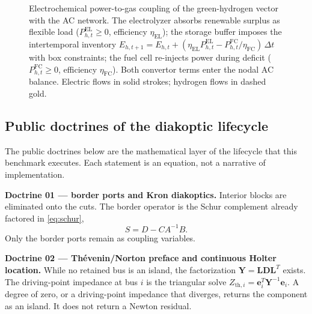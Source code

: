 \begin{figure}[!t]
\centering
\resizebox{0.85\textwidth}{!}{} %
\caption{Electrochemical power-to-gas coupling of the green-hydrogen vector with the AC network. The electrolyzer absorbs renewable surplus as flexible load ($P^{\mathrm{EL}}_{h,t} \ge 0$, efficiency $\eta_{\mathrm{EL}}$); the storage buffer imposes the intertemporal inventory $E_{h,t+1} = E_{h,t} + (\eta_{\mathrm{EL}} P^{\mathrm{EL}}_{h,t} - P^{\mathrm{FC}}_{h,t}/\eta_{\mathrm{FC}})\,\Delta t$ with box constraints; the fuel cell re-injects power during deficit ($P^{\mathrm{FC}}_{h,t} \ge 0$, efficiency $\eta_{\mathrm{FC}}$). Both convertor terms enter the nodal AC balance. Electric flows in solid strokes; hydrogen flows in dashed gold.}
\label{fig:p2g_h2}
\end{figure}


\subsection{Public doctrines of the diakoptic lifecycle}
\label{sub:doctrines}

The public doctrines below are the mathematical layer of the lifecycle that this benchmark executes. Each statement is an equation, not a narrative of implementation.

\textbf{Doctrine 01 --- border ports and Kron diakoptics.} Interior blocks are eliminated onto the cuts. The border operator is the Schur complement already factored in \eqref{eq:schur},
\begin{equation*}
S = D - C A^{-1} B.
\end{equation*}
Only the border ports remain as coupling variables.

\textbf{Doctrine 02 --- Th\'evenin/Norton preface and continuous Holter location.} While no retained bus is an island, the factorization $\mathbf{Y}=\mathbf{L}\mathbf{D}\mathbf{L}^{T}$ exists. The driving-point impedance at bus $i$ is the triangular solve $Z_{\mathrm{th},i}=\mathbf{e}_i^{T}\mathbf{Y}^{-1}\mathbf{e}_i$. A degree of zero, or a driving-point impedance that diverges, returns the component as an island. It does not return a Newton residual.

